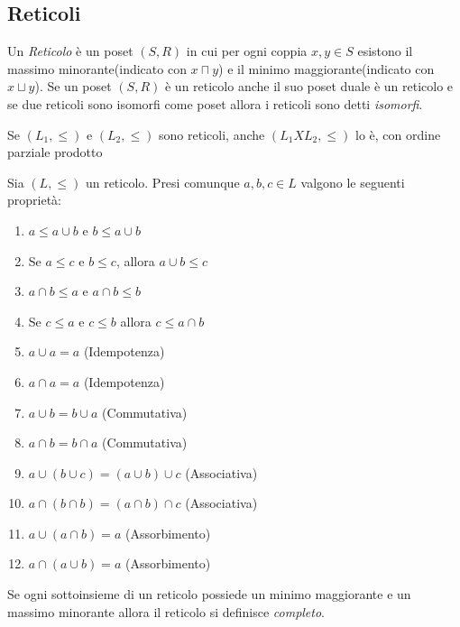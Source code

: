 \subsection{Reticoli}
Un \emph{Reticolo} è un poset $(S,R)$ in cui per ogni coppia $x,y \in S$ esistono
il massimo minorante(indicato con $x \sqcap y$) e il minimo maggiorante(indicato con $x \sqcup y$).
Se un poset $(S,R)$ è un reticolo anche il suo poset duale è un reticolo e se due
reticoli sono isomorfi come poset allora i reticoli sono detti \emph{isomorfi}.

\begin{prop}
    Se $(L_1,\leq)$ e $(L_2,\leq)$ sono reticoli, anche $(L_1 X L_2,\leq)$ lo è,
    con ordine parziale prodotto
\end{prop}

\begin{defi}
Sia $(L,\leq)$ un reticolo. Presi comunque $a,b,c \in L$ valgono le seguenti proprietà:
\end{defi}
\begin{enumerate}
    \item $a \leq a \cup b$ e $b \leq a \cup b$
    \item Se $a \leq c$ e $b \leq c$, allora $a \cup b \leq c$
    \item $a \cap b \leq a$ e $a \cap b \leq b$
    \item Se $c \leq a$ e $c \leq b$ allora $c \leq a \cap b$
    \item $a \cup a = a$ (Idempotenza)
    \item $a \cap a = a$ (Idempotenza)
    \item $a \cup b = b \cup a$ (Commutativa)
    \item $a \cap b = b \cap a$ (Commutativa)
    \item $a \cup (b \cup c) = (a \cup b) \cup c$ (Associativa)
    \item $a \cap (b \cap b) = (a \cap b) \cap c$ (Associativa)
    \item $a \cup(a \cap b) = a$ (Assorbimento)
    \item $a \cap (a \cup b) = a$ (Assorbimento)
\end{enumerate}

\begin{defi}
    Se ogni sottoinsieme di un reticolo possiede un minimo maggiorante e un massimo minorante
    allora il reticolo si definisce \emph{completo}.
\end{defi}

